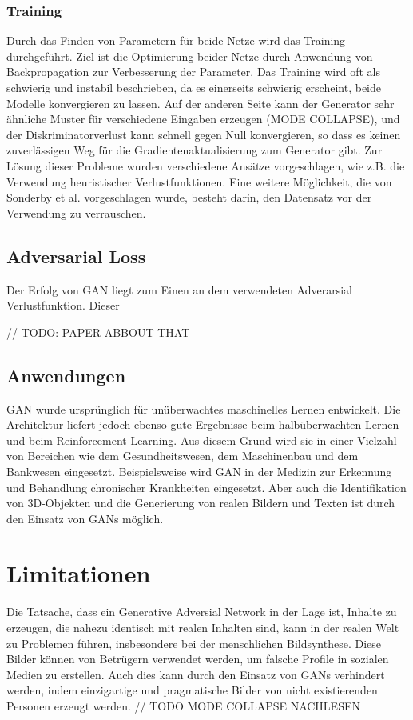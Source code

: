 \subsubsection*{Training}
Durch das Finden von Parametern für beide Netze wird das Training durchgeführt. Ziel ist die Optimierung beider Netze durch Anwendung von Backpropagation zur Verbesserung der Parameter. Das Training wird oft als schwierig und instabil beschrieben, da es einerseits schwierig erscheint, beide Modelle konvergieren zu lassen. Auf der anderen Seite kann der Generator sehr ähnliche Muster für verschiedene Eingaben erzeugen (MODE COLLAPSE), und der Diskriminatorverlust kann schnell gegen Null konvergieren, so dass es keinen zuverlässigen Weg für die Gradientenaktualisierung zum Generator gibt. 
Zur Lösung dieser Probleme wurden verschiedene Ansätze vorgeschlagen, wie z.B. die Verwendung heuristischer Verlustfunktionen. Eine weitere Möglichkeit, die von Sonderby et al. vorgeschlagen wurde, besteht darin, den Datensatz vor der Verwendung zu verrauschen\cite{Creswell.2018}.

\subsection*{Adversarial Loss}
Der Erfolg von GAN liegt zum Einen an dem verwendeten Adverarsial Verlustfunktion. Dieser 

// TODO: PAPER ABBOUT THAT

\subsection*{Anwendungen}
GAN wurde ursprünglich für unüberwachtes maschinelles Lernen entwickelt. Die Architektur liefert jedoch ebenso gute Ergebnisse beim halbüberwachten Lernen und beim Reinforcement Learning\cite{Aggarwal.2021}. 
Aus diesem Grund wird sie in einer Vielzahl von Bereichen wie dem Gesundheitswesen, dem Maschinenbau und dem Bankwesen eingesetzt. Beispielsweise wird GAN in der Medizin zur Erkennung und Behandlung chronischer Krankheiten eingesetzt. Aber auch die Identifikation von 3D-Objekten und die Generierung von realen Bildern und Texten ist durch den Einsatz von GANs möglich.

\section*{Limitationen}
Die Tatsache, dass ein Generative Adversial Network in der Lage ist, Inhalte zu erzeugen, die nahezu identisch mit realen Inhalten sind, kann in der realen Welt zu Problemen führen, insbesondere bei der menschlichen Bildsynthese. Diese Bilder können von Betrügern verwendet werden, um falsche Profile in sozialen Medien zu erstellen. 
Auch dies kann durch den Einsatz von GANs verhindert werden, indem einzigartige und pragmatische Bilder von nicht existierenden Personen erzeugt werden\cite{Aggarwal.2021}.
// TODO MODE COLLAPSE NACHLESEN


